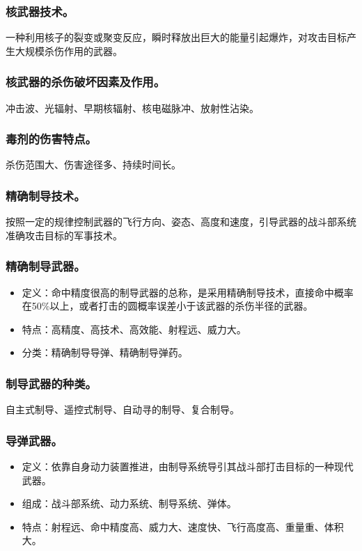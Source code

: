 \documentclass{article}
\begin{document}
\subsubsection{核武器技术。}
一种利用核子的裂变或聚变反应，瞬时释放出巨大的能量引起爆炸，对攻击目标产生大规模杀伤作用的武器。

\subsubsection{核武器的杀伤破坏因素及作用。}
冲击波、光辐射、早期核辐射、核电磁脉冲、放射性沾染。

\subsubsection{毒剂的伤害特点。}
杀伤范围大、伤害途径多、持续时间长。

\subsubsection{精确制导技术。}
按照一定的规律控制武器的飞行方向、姿态、高度和速度，引导武器的战斗部系统准确攻击目标的军事技术。

\subsubsection{精确制导武器。}
\begin{itemize}
    \item 定义：命中精度很高的制导武器的总称，是采用精确制导技术，直接命中概率在50\%以上，或者打击的圆概率误差小于该武器的杀伤半径的武器。
    \item 特点：高精度、高技术、高效能、射程远、威力大。
    \item 分类：精确制导导弹、精确制导弹药。
\end{itemize}

\subsubsection{制导武器的种类。}
自主式制导、遥控式制导、自动寻的制导、复合制导。

\subsubsection{导弹武器。}
\begin{itemize}
    \item 定义：依靠自身动力装置推进，由制导系统导引其战斗部打击目标的一种现代武器。
    \item 组成：战斗部系统、动力系统、制导系统、弹体。
    \item 特点：射程远、命中精度高、威力大、速度快、飞行高度高、重量重、体积大。
\end{itemize}
\end{document}
